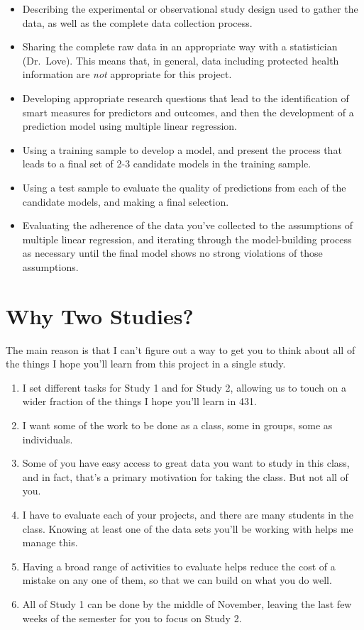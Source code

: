 \documentclass[]{book}
\providecommand{\tightlist}{%
  \setlength{\itemsep}{0pt}\setlength{\parskip}{0pt}}
\theoremstyle{definition}
\theoremstyle{definition}
\theoremstyle{definition}
\theoremstyle{remark}
\begin{document}
\begin{itemize}
\tightlist
\item
  Describing the experimental or observational study design used to
  gather the data, as well as the complete data collection process.
\item
  Sharing the complete raw data in an appropriate way with a
  statistician (Dr.~Love). This means that, in general, data including
  protected health information are \emph{not} appropriate for this
  project.
\item
  Developing appropriate research questions that lead to the
  identification of smart measures for predictors and outcomes, and then
  the development of a prediction model using multiple linear
  regression.
\item
  Using a training sample to develop a model, and present the process
  that leads to a final set of 2-3 candidate models in the training
  sample.
\item
  Using a test sample to evaluate the quality of predictions from each
  of the candidate models, and making a final selection.
\item
  Evaluating the adherence of the data you've collected to the
  assumptions of multiple linear regression, and iterating through the
  model-building process as necessary until the final model shows no
  strong violations of those assumptions.
\end{itemize}

\hypertarget{why-two-studies}{%
\section{Why Two Studies?}\label{why-two-studies}}

The main reason is that I can't figure out a way to get you to think
about all of the things I hope you'll learn from this project in a
single study.

\begin{enumerate}
\def\labelenumi{\arabic{enumi}.}
\tightlist
\item
  I set different tasks for Study 1 and for Study 2, allowing us to
  touch on a wider fraction of the things I hope you'll learn in 431.
\item
  I want some of the work to be done as a class, some in groups, some as
  individuals.
\item
  Some of you have easy access to great data you want to study in this
  class, and in fact, that's a primary motivation for taking the class.
  But not all of you.
\item
  I have to evaluate each of your projects, and there are many students
  in the class. Knowing at least one of the data sets you'll be working
  with helps me manage this.
\item
  Having a broad range of activities to evaluate helps reduce the cost
  of a mistake on any one of them, so that we can build on what you do
  well.
\item
  All of Study 1 can be done by the middle of November, leaving the last
  few weeks of the semester for you to focus on Study 2.
\end{enumerate}
\end{document}
